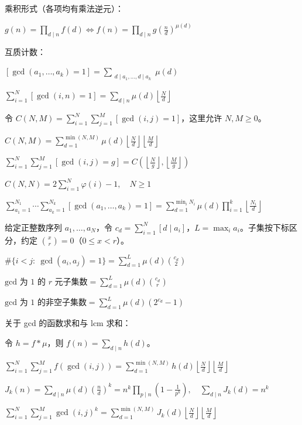 乘积形式（各项均有乘法逆元）：\nopagebreak[4]

$g(n)=\displaystyle\prod_{d\mid n}f(d)\iff f(n)=\prod_{d\mid n}g\left(\frac nd\right)^{\mu(d)}$

互质计数：\nopagebreak[4]

$[\gcd(a_1,\dots,a_k)=1]=\displaystyle\sum_{\substack{d\mid a_1,\dots,d\mid a_k}}\mu(d)$

$\displaystyle\sum_{i=1}^{N}[\gcd(i,n)=1]=\sum_{d\mid n}\mu(d)\left\lfloor\frac Nd\right\rfloor$

令 $C(N,M)=\sum_{i=1}^{N}\sum_{j=1}^{M}[\gcd(i,j)=1]$，这里允许 $N,M\ge0$。\nopagebreak[4]

$C(N,M)=\displaystyle\sum_{d=1}^{\min(N,M)}\mu(d)\left\lfloor\frac Nd\right\rfloor\left\lfloor\frac Md\right\rfloor$

$\displaystyle\sum_{i=1}^{N}\sum_{j=1}^{M}[\gcd(i,j)=g]=C\left(\left\lfloor\frac Ng\right\rfloor,\left\lfloor\frac Mg\right\rfloor\right)$

$C(N,N)=2\displaystyle\sum_{i=1}^{N}\varphi(i)-1,\quad N\ge1$

$\displaystyle\sum_{a_1=1}^{N_1}\cdots\sum_{a_k=1}^{N_k}[\gcd(a_1,\dots,a_k)=1]=\sum_{d=1}^{\min_iN_i}\mu(d)\prod_{i=1}^{k}\left\lfloor\frac{N_i}{d}\right\rfloor$

给定正整数序列 $a_1,\dots,a_N$，令 $c_d=\sum_{i=1}^{N}[d\mid a_i]$，$L=\max_i a_i$。子集按下标区分，约定 $\binom xr=0$（$0\le x<r$）。\nopagebreak[4]

$\#\{i<j:\ \gcd(a_i,a_j)=1\}=\displaystyle\sum_{d=1}^{L}\mu(d)\binom{c_d}{2}$

$\text{gcd 为 $1$ 的 $r$ 元子集数}=\displaystyle\sum_{d=1}^{L}\mu(d)\binom{c_d}{r}$

$\text{gcd 为 $1$ 的非空子集数}=\displaystyle\sum_{d=1}^{L}\mu(d)(2^{c_d}-1)$

关于 gcd 的函数求和与 lcm 求和：\nopagebreak[4]

令 $h=f*\mu$，则 $f(n)=\sum_{d\mid n}h(d)$。\nopagebreak[4]

$\displaystyle\sum_{i=1}^{N}\sum_{j=1}^{M}f(\gcd(i,j))=\sum_{d=1}^{\min(N,M)}h(d)\left\lfloor\frac Nd\right\rfloor\left\lfloor\frac Md\right\rfloor$

$J_k(n)=\displaystyle\sum_{d\mid n}\mu(d)\left(\frac nd\right)^k=n^k\prod_{p\mid n}\left(1-\frac1{p^k}\right),\quad\sum_{d\mid n}J_k(d)=n^k$

$\displaystyle\sum_{i=1}^{N}\sum_{j=1}^{M}\gcd(i,j)^k=\sum_{d=1}^{\min(N,M)}J_k(d)\left\lfloor\frac Nd\right\rfloor\left\lfloor\frac Md\right\rfloor$

